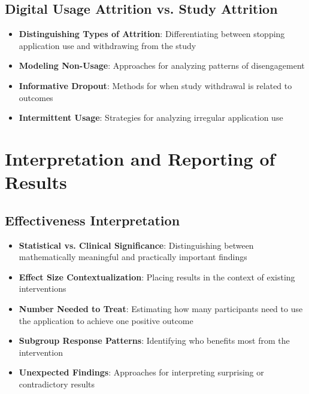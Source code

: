 \subsection{Digital Usage Attrition vs. Study Attrition}
\begin{itemize}
    \item \textbf{Distinguishing Types of Attrition}: Differentiating between stopping application use and withdrawing from the study
    
    \item \textbf{Modeling Non-Usage}: Approaches for analyzing patterns of disengagement
    
    \item \textbf{Informative Dropout}: Methods for when study withdrawal is related to outcomes
    
    \item \textbf{Intermittent Usage}: Strategies for analyzing irregular application use
\end{itemize}

\section{Interpretation and Reporting of Results}
\subsection{Effectiveness Interpretation}
\begin{itemize}
    \item \textbf{Statistical vs. Clinical Significance}: Distinguishing between mathematically meaningful and practically important findings
    
    \item \textbf{Effect Size Contextualization}: Placing results in the context of existing interventions
    
    \item \textbf{Number Needed to Treat}: Estimating how many participants need to use the application to achieve one positive outcome
    
    \item \textbf{Subgroup Response Patterns}: Identifying who benefits most from the intervention
    
    \item \textbf{Unexpected Findings}: Approaches for interpreting surprising or contradictory results
\end{itemize}

